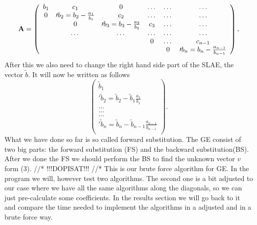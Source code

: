 \documentclass[10pt]{article}
\begin{document}
\begin{equation}
    {\bf A} = \left(\begin{array}{cccccc}
                             b_1& c_1 & 0 &\dots   & \dots &\dots \\
                           0 & \prime{b_2}=b_2-\frac{a_1}{b_1} & c_2 &\dots &\dots &\dots \\
                           & 0 & \prime{b_3}=b_3-\frac{a_2}{b_2} & c_3 & \dots & \dots \\
                           & \dots   & \dots &\dots   &\dots & \dots \\
                           &   &  &0  &\dots & c_{n-1} \\
                           &    &  &   &0 & \prime{b_n}=b_{n}-\frac{a_{n-1}}{b_{n-1}} \\
                      \end{array} \right),
\end{equation}
After this we also need to change the right hand side part of the SLAE, the vector $ \tilde{b} $. It will now be written as follows
\begin{equation}
\left(\begin{array}{c}
                           \tilde{b}_1\\
                           \prime{\tilde{b}_2}=\tilde{b}_2-\tilde{b}_1\frac{a_1}{b_1}\\
                           \dots \\
                           \dots \\
                          \dots \\
                           \prime{\tilde{b}_n}=\tilde{b}_n - \tilde{b}_{n-1}\frac{a_{n-1}}{b_{n-1}}\\
                      \end{array} \right).
\end{equation}
What we have done so far is so called forward substitution. The GE consist of two big parts: the forward substitution (FS) and the backward substitution(BS). After we done the FS we should perform the BS to find the unknown vector $ v $ form (3).
//*
!!!DOPISAT!!!
//*
This is our brute force algorithm for GE. In the program we will, however test two algorithms. The second one is a bit adjusted to our case where we have all the same algorithms along the diagonals, so we can just pre-calculate some coefficients. In the results section we will go back to it and compare the time needed to implement the algorithms in a adjusted and in a brute force way.
\end{document}
